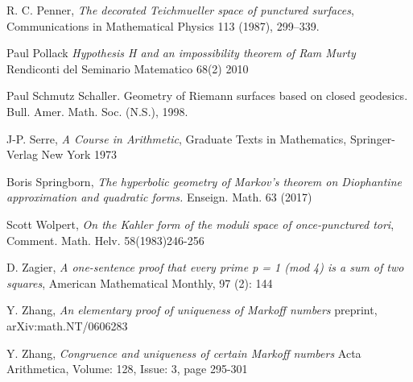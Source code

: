 \documentclass[12pt,a4paper]{amsart}
\begin{document}
R. C. Penner, 
\textit{The decorated Teichmueller space of punctured surfaces}, 
Communications in Mathematical Physics 113 (1987), 299–339.

Paul Pollack
\textit{ Hypothesis H and an impossibility theorem of Ram Murty }
Rendiconti del Seminario Matematico 68(2) 2010

 Paul Schmutz Schaller. Geometry of Riemann surfaces based on closed geodesics. Bull. Amer.
Math. Soc. (N.S.),  1998.

J-P. Serre,
\textit{A Course in Arithmetic},
Graduate Texts in Mathematics,
Springer-Verlag New York
1973

Boris Springborn, 
\textit{The hyperbolic geometry of Markov’s theorem on Diophantine
approximation and quadratic forms.} Enseign. Math. 63 (2017)

Scott Wolpert,
\textit{On the Kahler form of the moduli space of once-punctured tori}, 
Comment. Math. Helv. 58(1983)246-256

D. Zagier,
 \textit{A one-sentence proof that every prime p = 1 (mod 4) is a sum of two squares}, 
 American Mathematical Monthly, 97 (2): 144
 
 Y. Zhang,
 \textit{ An elementary proof of uniqueness of Markoff numbers}
 preprint, arXiv:math.NT/0606283
 
   Y. Zhang,
 \textit{Congruence and uniqueness of certain Markoff numbers}
 Acta Arithmetica, Volume: 128, Issue: 3, page 295-301



%

%
%
%
%
%
%
%



% 
 
\end{document}
